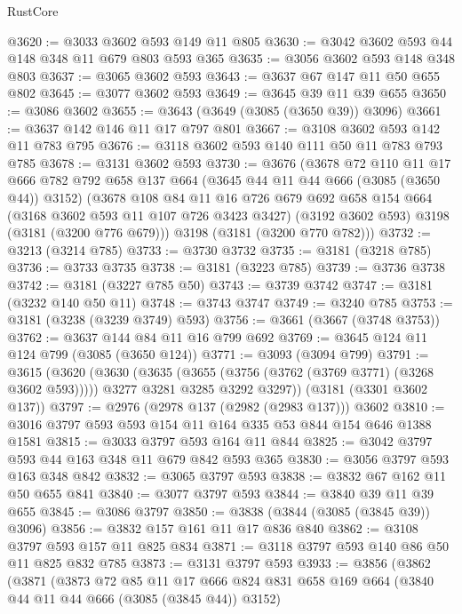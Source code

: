 \begin{lexlean}{RustCore}
\begin{coremodule}
@3620 := @3033 @3602 @593 @149 @11 @805
@3630 := @3042 @3602 @593 @44 @148 @348 @11 @679 @803 @593 @365
@3635 := @3056 @3602 @593 @148 @348 @803
@3637 := @3065 @3602 @593
@3643 := @3637 @67 @147 @11 @50 @655 @802
@3645 := @3077 @3602 @593
@3649 := @3645 @39 @11 @39 @655
@3650 := @3086 @3602
@3655 := @3643 (@3649 (@3085 (@3650 @39)) @3096)
@3661 := @3637 @142 @146 @11 @17 @797 @801
@3667 := @3108 @3602 @593 @142 @11 @783 @795
@3676 := @3118 @3602 @593 @140 @111 @50 @11 @783 @793 @785
@3678 := @3131 @3602 @593
@3730 := @3676
    (@3678
      @72
      @110
      @11
      @17
      @666
      @782
      @792
      @658
      @137
      @664
      (@3645 @44 @11 @44 @666 (@3085 (@3650 @44)) @3152)
      (@3678
        @108
        @84
        @11
        @16
        @726
        @679
        @692
        @658
        @154
        @664
        (@3168 @3602 @593 @11 @107 @726 @3423 @3427)
        (@3192 @3602 @593)
        @3198
        (@3181 (@3200 @776 @679)))
      @3198
      (@3181 (@3200 @770 @782)))
@3732 := @3213 (@3214 @785)
@3733 := @3730 @3732
@3735 := @3181 (@3218 @785)
@3736 := @3733 @3735
@3738 := @3181 (@3223 @785)
@3739 := @3736 @3738
@3742 := @3181 (@3227 @785 @50)
@3743 := @3739 @3742
@3747 := @3181 (@3232 @140 @50 @11)
@3748 := @3743 @3747
@3749 := @3240 @785
@3753 := @3181 (@3238 (@3239 @3749) @593)
@3756 := @3661 (@3667 (@3748 @3753))
@3762 := @3637 @144 @84 @11 @16 @799 @692
@3769 := @3645 @124 @11 @124 @799 (@3085 (@3650 @124))
@3771 := @3093 (@3094 @799)
@3791 := @3615
    (@3620
      (@3630
        (@3635 (@3655 (@3756 (@3762 (@3769 @3771) (@3268 @3602 @593)))))
        @3277
        @3281
        @3285
        @3292
        @3297))
    (@3181 (@3301 @3602 @137))
@3797 := @2976 (@2978 @137 (@2982 (@2983 @137))) @3602
@3810 := @3016 @3797 @593 @593 @154 @11 @164 @335 @53 @844 @154 @646 @1388 @1581
@3815 := @3033 @3797 @593 @164 @11 @844
@3825 := @3042 @3797 @593 @44 @163 @348 @11 @679 @842 @593 @365
@3830 := @3056 @3797 @593 @163 @348 @842
@3832 := @3065 @3797 @593
@3838 := @3832 @67 @162 @11 @50 @655 @841
@3840 := @3077 @3797 @593
@3844 := @3840 @39 @11 @39 @655
@3845 := @3086 @3797
@3850 := @3838 (@3844 (@3085 (@3845 @39)) @3096)
@3856 := @3832 @157 @161 @11 @17 @836 @840
@3862 := @3108 @3797 @593 @157 @11 @825 @834
@3871 := @3118 @3797 @593 @140 @86 @50 @11 @825 @832 @785
@3873 := @3131 @3797 @593
@3933 := @3856
    (@3862
      (@3871
        (@3873
          @72
          @85
          @11
          @17
          @666
          @824
          @831
          @658
          @169
          @664
          (@3840 @44 @11 @44 @666 (@3085 (@3845 @44)) @3152)

\end{coremodule}
\end{lexlean}
